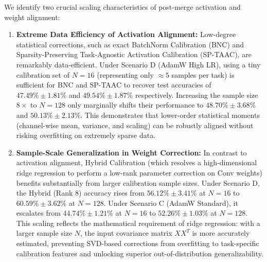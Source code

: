 \documentclass{article}
\theoremstyle{plain}
\theoremstyle{definition}
\theoremstyle{remark}
\begin{document}
We identify two crucial scaling characteristics of post-merge activation and weight alignment:
\begin{enumerate}
    \item \textbf{Extreme Data Efficiency of Activation Alignment:} Low-degree statistical corrections, such as exact BatchNorm Calibration (BNC) and Sparsity-Preserving Task-Agnostic Activation Calibration (SP-TAAC), are remarkably data-efficient. Under Scenario D (AdamW High LR), using a tiny calibration set of $N=16$ (representing only $\approx 5$ samples per task) is sufficient for BNC and SP-TAAC to recover test accuracies of $47.49\% \pm 1.81\%$ and $49.54\% \pm 1.87\%$ respectively. Increasing the sample size $8\times$ to $N=128$ only marginally shifts their performance to $48.70\% \pm 3.68\%$ and $50.13\% \pm 2.13\%$. This demonstrates that lower-order statistical moments (channel-wise mean, variance, and scaling) can be robustly aligned without risking overfitting on extremely sparse data.
    \item \textbf{Sample-Scale Generalization in Weight Correction:} In contrast to activation alignment, Hybrid Calibration (which resolves a high-dimensional ridge regression to perform a low-rank parameter correction on Conv weights) benefits substantially from larger calibration sample sizes. Under Scenario D, the Hybrid (Rank 8) accuracy rises from $56.12\% \pm 3.41\%$ at $N=16$ to $60.59\% \pm 3.62\%$ at $N=128$. Under Scenario C (AdamW Standard), it escalates from $44.74\% \pm 1.21\%$ at $N=16$ to $52.26\% \pm 1.03\%$ at $N=128$. This scaling reflects the mathematical requirement of ridge regression: with a larger sample size $N$, the input covariance matrix $XX^T$ is more accurately estimated, preventing SVD-based corrections from overfitting to task-specific calibration features and unlocking superior out-of-distribution generalizability.
\end{enumerate}
\end{document}
